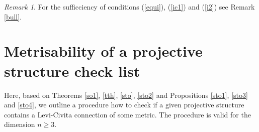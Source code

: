 \documentclass[letterpaper]{amsart}
\theoremstyle{definition}
\theoremstyle{remark}
\newtheorem{remark}[theorem]{Remark}
\begin{document}
\begin{remark}
For the sufficciency of conditions (\ref{equi}), (\ref{ic1}) and
(\ref{i2}) see Remark \ref{bull}.
\end{remark}

\section{Metrisability of a projective structure check list}\label{bu}
Here, based on Theorems \ref{so1}, \ref{tth}, \ref{sto}, \ref{sto2}
and Propositions \ref{sto1}, \ref{sto3} and \ref{sto4}, we outline a
procedure how to check if a given projective structure contains a
Levi-Civita connection of some metric. The procedure is valid for the
dimension $n\geq 3$.
\end{document}
